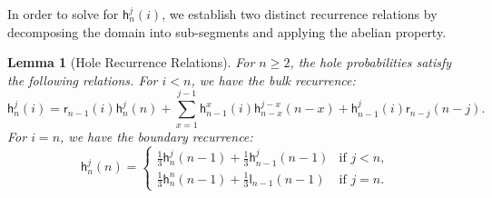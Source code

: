\documentclass[11pt]{article}
\newtheorem{lemma}{Lemma}[section]
\newcommand{\sgrleft}[2]{\mathsf{l}_{#1}(#2)}
\newcommand{\sgrright}[2]{\mathsf{r}_{#1}(#2)}
\begin{document}
In order to solve for $\mathsf{h}_n^j(i)$, we establish two distinct recurrence relations by decomposing the domain into sub-segments and applying the abelian property.

\begin{lemma}[Hole Recurrence Relations]\label{lemma:hole-recurrence}
    For $n \ge 2$, the hole probabilities satisfy the following relations. 
    For $i < n$, we have the bulk recurrence:
    \begin{equation*}
        \mathsf{h}_n^j(i) = \sgrright{n-1}{i}\mathsf{h}_n^j(n) + \sum_{x=1}^{j-1} \mathsf{h}_{n-1}^x(i)\mathsf{h}_{n-x}^{j-x}(n-x) + \mathsf{h}_{n-1}^j(i)\sgrright{n-j}{n-j}.
    \end{equation*}
    For $i=n$, we have the boundary recurrence:
    \begin{equation*}
        \mathsf{h}_n^j(n) = 
        \begin{cases}
            \frac{1}{3}\mathsf{h}_n^j(n-1) + \frac{1}{3}\mathsf{h}_{n-1}^j(n-1) & \text{if } j < n, \\
            \frac{1}{3}\mathsf{h}_n^n(n-1) + \frac{1}{3}\sgrleft{n-1}{n-1} & \text{if } j = n.
        \end{cases}
    \end{equation*}
\end{lemma}
\end{document}
